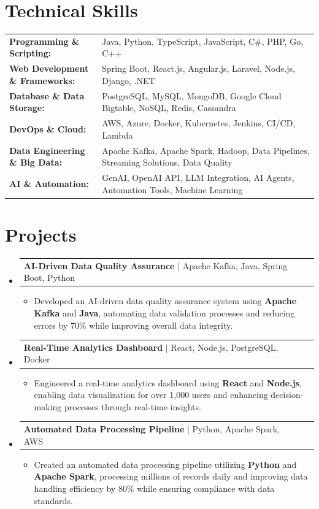 \documentclass[letterpaper,10pt]{article}
\makeatletter
\newcommand{\resumeItem}[1]{
  \item{\fontsize{8pt}{9pt}\selectfont
    #1 \vspace{-3pt}
  }
}
\newcommand{\resumeProjectHeading}[2]{
    \item
    \begin{tabular*}{1.001\textwidth}{l@{\extracolsep{\fill}}r}
      \fontsize{8.5pt}{10pt}#1 & \textbf{\fontsize{8.5pt}{10pt} #2}\\
    \end{tabular*}\vspace{-7pt}
}
\newcommand{\resumeSubHeadingListStart}{\begin{itemize}[leftmargin=0pt, label={}]}
\newcommand{\resumeSubHeadingListEnd}{\end{itemize}}
\newcommand{\resumeItemListStart}{\begin{itemize}[leftmargin=*]}
\newcommand{\resumeItemListEnd}{\end{itemize}\vspace{-5pt}}
\makeatother
\begin{document}
\section{Technical Skills}
        \vspace{-14pt}
        \begin{table}[h]
            \fontsize{8pt}{9pt}\selectfont
            \begin{tabular}{p{0.3\linewidth} p{0.7\linewidth}}
                \textbf{Programming \& Scripting:} & Java, Python, TypeScript, JavaScript, C\#, PHP, Go, C++ \\
                \textbf{Web Development \& Frameworks:} & Spring Boot, React.js, Angular.js, Laravel, Node.js, Django, .NET \\
                \textbf{Database \& Data Storage:} & PostgreSQL, MySQL, MongoDB, Google Cloud Bigtable, NoSQL, Redis, Cassandra \\
                \textbf{DevOps \& Cloud:} & AWS, Azure, Docker, Kubernetes, Jenkins, CI/CD, Lambda \\
                \textbf{Data Engineering \& Big Data:} & Apache Kafka, Apache Spark, Hadoop, Data Pipelines, Streaming Solutions, Data Quality \\
                \textbf{AI \& Automation:} & GenAI, OpenAI API, LLM Integration, AI Agents, Automation Tools, Machine Learning \\
            \end{tabular}
        \end{table}
 \vspace{-18pt}

\section{Projects}
    \vspace{-5pt}
    \resumeSubHeadingListStart
          \resumeProjectHeading
            {\textbf{AI-Driven Data Quality Assurance} $|$ Apache Kafka, Java, Spring Boot, Python}{}
            \resumeItemListStart
                \resumeItem{Developed an AI-driven data quality assurance system using \textbf{Apache Kafka} and \textbf{Java}, automating data validation processes and reducing errors by 70\% while improving overall data integrity.}
            \resumeItemListEnd
        \vspace{-12pt}
    
        \resumeProjectHeading
            {\textbf{Real-Time Analytics Dashboard} $|$ React, Node.js, PostgreSQL, Docker}{}
        \resumeItemListStart
                \resumeItem{Engineered a real-time analytics dashboard using \textbf{React} and \textbf{Node.js}, enabling data visualization for over 1,000 users and enhancing decision-making processes through real-time insights.}
        \resumeItemListEnd
      \vspace{-12pt}
      \resumeProjectHeading
        {\textbf{Automated Data Processing Pipeline} $|$ Python, Apache Spark, AWS}{}
    \resumeItemListStart
            \resumeItem{Created an automated data processing pipeline utilizing \textbf{Python} and \textbf{Apache Spark}, processing millions of records daily and improving data handling efficiency by 80\% while ensuring compliance with data standards.}
    \resumeItemListEnd
    \resumeSubHeadingListEnd
\end{document}
